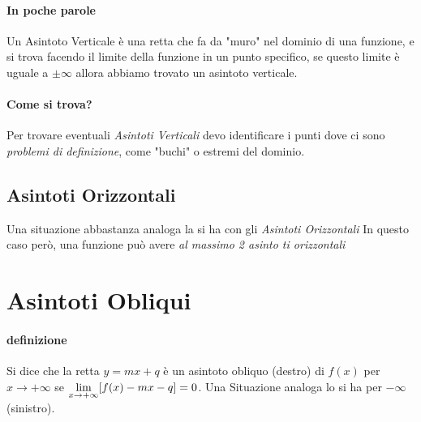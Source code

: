 \documentclass[12pt, a4paper, openany]{book}
\begin{document}
\paragraph*{In poche parole} Un Asintoto Verticale è una retta che fa da "muro" nel dominio di una funzione, e si trova facendo il limite della funzione in un punto specifico, se questo limite è uguale a $\pm \infty$ allora abbiamo trovato un asintoto verticale.

\paragraph*{Come si trova?} Per trovare eventuali \emph{Asintoti Verticali} devo identificare i punti dove ci sono \emph{problemi di definizione},
come "buchi" o estremi del dominio.

\subsection*{Asintoti Orizzontali}
Una situazione abbastanza analoga la si ha con gli \emph{Asintoti Orizzontali}
In questo caso però, una funzione può avere \emph{al massimo 2 asinto   ti orizzontali}

\section{Asintoti Obliqui}
\paragraph*{definizione}{ %
	Si dice che la retta $y=mx + q$ è un asintoto obliquo (destro) di $f(x)$ per $x \to +\infty$ se
	$\underset{x \to +\infty}{\lim} [f(x)-mx-q]=0$.
	Una Situazione analoga lo si ha per $-\infty $ (sinistro).
}
\end{document}
